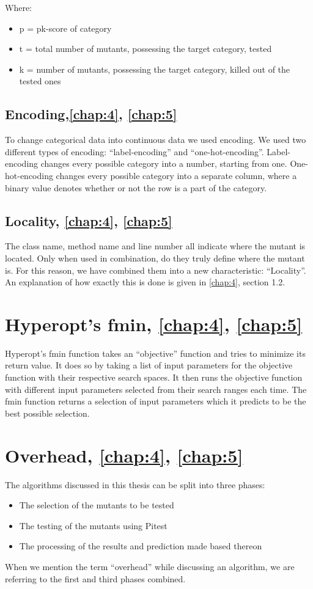 \documentclass[twoside]{uva-inf-bachelor-thesis}
\begin{document}
Where:
\begin{itemize}
    \item p = pk-score of category
    \item t = total number of mutants, possessing the target category, tested
    \item k = number of mutants, possessing the target category, killed out of the tested ones
\end{itemize}

\subsection{Encoding,\textbf{\cref{chap:4}, \cref{chap:5}}}
To change categorical data into continuous data we used encoding. We used two different types of encoding: ``label-encoding'' and ``one-hot-encoding''. Label-encoding changes every possible category into a number, starting from one. One-hot-encoding changes every possible category into a separate column, where a binary value denotes whether or not the row is a part of the category.

\subsection{Locality, \textbf{\cref{chap:4}, \cref{chap:5}}}
The class name, method name and line number all indicate where the mutant is located. Only when used in combination, do they truly define where the mutant is. For this reason, we have combined them into a new characteristic: ``Locality''. An explanation of how exactly this is done is given in \cref{chap:4}, section 1.2.

\section{Hyperopt's fmin, \textbf{\cref{chap:4}, \cref{chap:5}}}
Hyperopt's fmin function takes an “objective” function and tries to minimize its return value. It does so by taking a list of input parameters for the objective function with their respective search spaces. It then runs the objective function with different input parameters selected from their search ranges each time. The fmin function returns a selection of input parameters which it predicts to be the best possible selection.

\section{Overhead, \textbf{\cref{chap:4}, \cref{chap:5}}}
The algorithms discussed in this thesis can be split into three phases:
\begin{itemize}
    \item The selection of the mutants to be tested
    \item The testing of the mutants using Pitest
    \item The processing of the results and prediction made based thereon
\end{itemize}
When we mention the term ``overhead'' while discussing an algorithm, we are referring to the first and third phases combined.
\end{document}
